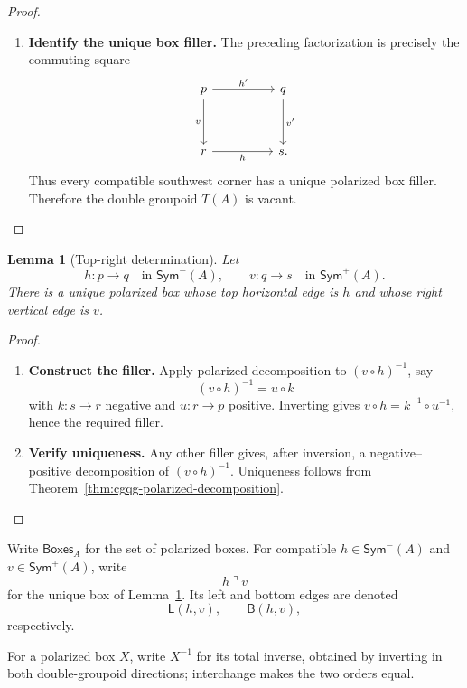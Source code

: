 \documentclass[oneside]{article}
\newcommand{\Boxes}{\mathsf{Boxes}}
\newcommand{\Sym}{\mathsf{Sym}}
\newcommand{\trcorner}{\mathbin{\urcorner}}
\newcommand{\leftedge}[2]{\mathsf{L}(#1,#2)}
\newcommand{\bottomedge}[2]{\mathsf{B}(#1,#2)}
\theoremstyle{plain}
\newtheorem{lemma}[theorem]{Lemma}
\theoremstyle{definition}
\theoremstyle{remark}
\begin{document}
\begin{proof}
\begin{enumerate}[beginpenalty=10000]
        \item \textbf{Identify the unique box filler.} The preceding factorization is precisely the commuting square
        \[
            \begin{tikzcd}[column sep=huge,row sep=huge]
                p \arrow[r,"h'"] \arrow[d,"v"']
                & q \arrow[d,"v'"] \\
                r \arrow[r,"h"']
                & s.
            \end{tikzcd}
        \]
        Thus every compatible southwest corner has a unique polarized box filler. Therefore the double groupoid \(T(A)\) is vacant. \qedhere
    \end{enumerate}
\end{proof}

\begin{lemma}[Top-right determination]
\label{lem:cgqg-polarized-top-right-determination}
    Let
    \[
        h:p\longrightarrow q
        \quad\text{in }\Sym^-(A),
        \qquad
        v:q\longrightarrow s
        \quad\text{in }\Sym^+(A).
    \]
    There is a unique polarized box whose top horizontal edge is \(h\) and whose right vertical edge is \(v\).
\end{lemma}
\begin{proof}
    \leavevmode
    \begin{enumerate}[beginpenalty=10000]
        \item \textbf{Construct the filler.} Apply polarized decomposition to \((v\circ h)^{-1}\), say
        \[
            (v\circ h)^{-1}=u\circ k
        \]
        with \(k:s\to r\) negative and \(u:r\to p\) positive.
        Inverting gives \(v\circ h=k^{-1}\circ u^{-1}\), hence the required filler.

        \item \textbf{Verify uniqueness.} Any other filler gives, after inversion, a negative--positive decomposition of \((v\circ h)^{-1}\). Uniqueness follows from Theorem~\ref{thm:cgqg-polarized-decomposition}. \qedhere
    \end{enumerate}
\end{proof}

Write \(\Boxes_A\) for the set of polarized boxes. For compatible \(h\in\Sym^-(A)\) and \(v\in\Sym^+(A)\), write
\[
    h\trcorner v
\]
for the unique box of Lemma~\ref{lem:cgqg-polarized-top-right-determination}. Its left and bottom edges are denoted
\[
    \leftedge{h}{v},
    \qquad
    \bottomedge{h}{v},
\]
respectively.

For a polarized box \(X\), write \(X^{-1}\) for its total inverse, obtained by inverting in both double-groupoid directions; interchange makes the two orders equal.
\end{document}
